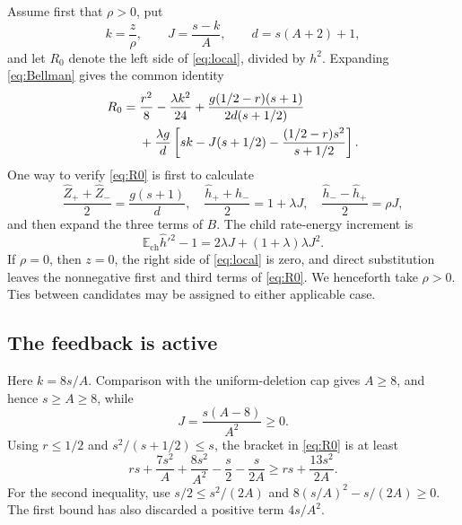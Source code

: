\documentclass[11pt]{article}
\numberwithin{equation}{section}
\theoremstyle{remark}
\newcommand{\E}{\mathbb E}
\begin{document}
Assume first that \(\rho>0\), put
\begin{equation}\label{eq:kJd}
k=\frac z\rho,\qquad J=\frac{s-k}{A},\qquad d=s(A+2)+1,
\end{equation}
and let \(R_0\) denote the left side of \eqref{eq:local}, divided by
\(h^2\). Expanding \eqref{eq:Bellman} gives the common identity
\begin{align}
R_0={}&\frac{r^2}{8}-\frac{\lambda k^2}{24}
+\frac{g(1/2-r)(s+1)}{2d(s+1/2)} \notag\\
&+\frac{\lambda g}{d}
\left[sk-J(s+1/2)-\frac{(1/2-r)s^2}{s+1/2}\right].
\label{eq:R0}
\end{align}
One way to verify \eqref{eq:R0} is first to calculate
\[
\frac{\widehat Z_++\widehat Z_-}{2}=\frac{g(s+1)}d,
\quad
\frac{\widehat h_++\widehat h_-}{2}=1+\lambda J,
\quad
\frac{\widehat h_- -\widehat h_+}{2}=\rho J,
\]
and then expand the three terms of \(B\). The child rate-energy increment is
\begin{equation}\label{eq:rate-increment}
\E_{\mathrm{ch}}\widehat h'^2-1
=2\lambda J+(1+\lambda)\lambda J^2.
\end{equation}
If \(\rho=0\), then \(z=0\), the right side of \eqref{eq:local} is zero,
and direct substitution leaves the nonnegative first and third terms of
\eqref{eq:R0}. We henceforth take \(\rho>0\). Ties between candidates may
be assigned to either applicable case.

\subsection{The feedback is active}

Here \(k=8s/A\). Comparison with the uniform-deletion cap gives
\(A\ge8\), and hence \(s\ge A\ge8\), while
\[
J=\frac{s(A-8)}{A^2}\ge0.
\]
Using \(r\le1/2\) and \(s^2/(s+1/2)\le s\), the bracket in
\eqref{eq:R0} is at least
\begin{equation}\label{eq:feedback-bracket}
rs+\frac{7s^2}{A}+\frac{8s^2}{A^2}
-\frac s2-\frac{s}{2A}
\ge rs+\frac{13s^2}{2A}.
\end{equation}
For the second inequality, use \(s/2\le s^2/(2A)\) and
\(8(s/A)^2-s/(2A)\ge0\). The first bound has also discarded a positive
term \(4s/A^2\).
\end{document}
